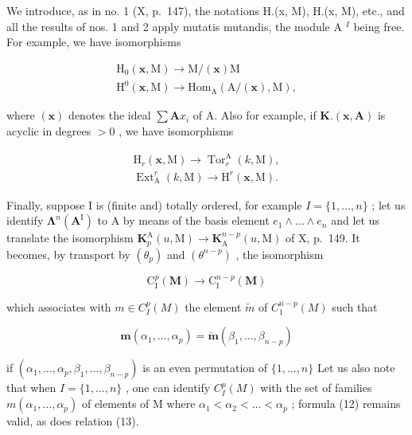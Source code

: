 We introduce, as in no. 1 (X, p.~147), the notations H.(x, M), H.(x, M), etc., and all the results of nos. 1 and 2 apply mutatis mutandis, the module A \(^{I}\) being free. For example, we have isomorphisms

\[
\begin{array}{l} \mathrm{H} _ {0} (\boldsymbol {x}, \mathrm{M}) \to \mathrm{M} / (\boldsymbol {x}) \mathrm{M} \\ \mathrm{H} ^ {0} (\boldsymbol {x}, \mathrm{M}) \to \mathrm{Hom} _ {\mathrm{A}} \left(\mathrm{A} / (\boldsymbol {x}), \mathrm{M}\right), \end{array}
\]

where \((\pmb{x})\) denotes the ideal \(\sum \mathbf{A}x_{i}\) of A. Also for example, if \(\mathbf{K}.(\pmb{x},\mathbf{A})\) is acyclic in degrees \(>0\) , we have isomorphisms

\[
\begin{array}{l}\mathrm{H} _ {r} (\boldsymbol {x}, \mathrm{M}) \rightarrow \operatorname{Tor} _ {r} ^ {\mathrm{A}} (k, \mathrm{M}),\\\operatorname{Ext} _ {\mathrm{A}} ^ {r} (k, \mathrm{M}) \rightarrow \mathrm{H} ^ {r} (\boldsymbol {x}, \mathrm{M}).\end{array}
\]

Finally, suppose I is (finite and) totally ordered, for example \(I = \{1, \ldots, n\}\) ; let us identify \(\symbf{\Lambda}^{n}(\mathbf{A}^{\mathrm{I}})\) to A by means of the basis element \(e_{1} \wedge \ldots \wedge e_{n}\) and let us translate the isomorphism \(\mathbf{K}_{p}^{\mathrm{A}}(u, \mathrm{M}) \to \mathbf{K}_{\mathrm{A}}^{n-p}(u, \mathrm{M})\) of X, p.~149. It becomes, by transport by \((\theta_{p})\) and \((\theta^{n-p})\) , the isomorphism

\[
\mathrm{C} _ {\mathrm{I}} ^ {p} (\mathbf {M}) \rightarrow \mathrm{C} _ {\mathrm{I}} ^ {n - p} (\mathbf {M})
\]

which associates with \(m \in C_{I}^{p}(M)\) the element \(\check{m}\) of \(C_{1}^{n-p}(M)\) such that

\[
\boldsymbol {m} \left(\alpha_ {1}, \dots , \alpha_ {p}\right) = \check {\boldsymbol {m}} \left(\beta_ {1}, \dots , \beta_ {n - p}\right)\tag{13}
\]

if \((\alpha_{1},\ldots,\alpha_{p},\beta_{1},\ldots,\beta_{n-p})\) is an even permutation of \(\{1,\ldots,n\}\) Let us also note that when \(I=\{1,\ldots,n\}\) , one can identify \(C_{I}^{p}(M)\) with the set of families \(m(\alpha_{1},\ldots,\alpha_{p})\) of elements of M where \(\alpha_{1}<\alpha_{2}<\ldots<\alpha_{p}\) ; formula (12) remains valid, as does relation (13).

